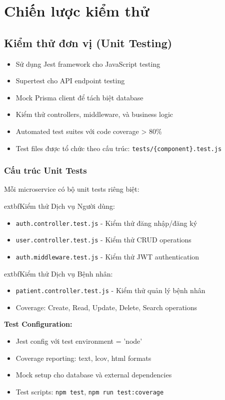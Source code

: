 \documentclass[12pt,a4paper]{report}
\begin{document}
    \section{Chiến lược kiểm thử}

    \subsection{Kiểm thử đơn vị (Unit Testing)}
    \begin{itemize}
        \item Sử dụng Jest framework cho JavaScript testing
        \item Supertest cho API endpoint testing
        \item Mock Prisma client để tách biệt database
        \item Kiểm thử controllers, middleware, và business logic
        \item Automated test suites với code coverage > 80\%
        \item Test files được tổ chức theo cấu trúc: \texttt{tests/\{component\}.test.js}
    \end{itemize}

    \subsubsection{Cấu trúc Unit Tests}
    Mỗi microservice có bộ unit tests riêng biệt:

    	extbf{Kiểm thử Dịch vụ Người dùng:}
    \begin{itemize}
        \item \texttt{auth.controller.test.js} - Kiểm thử đăng nhập/đăng ký
        \item \texttt{user.controller.test.js} - Kiểm thử CRUD operations
        \item \texttt{auth.middleware.test.js} - Kiểm thử JWT authentication
    \end{itemize}

    	extbf{Kiểm thử Dịch vụ Bệnh nhân:}
    \begin{itemize}
        \item \texttt{patient.controller.test.js} - Kiểm thử quản lý bệnh nhân
        \item Coverage: Create, Read, Update, Delete, Search operations
    \end{itemize}

    \textbf{Test Configuration:}
    \begin{itemize}
        \item Jest config với test environment = 'node'
        \item Coverage reporting: text, lcov, html formats
        \item Mock setup cho database và external dependencies
        \item Test scripts: \texttt{npm test}, \texttt{npm run test:coverage}
    \end{itemize}
\end{document}

